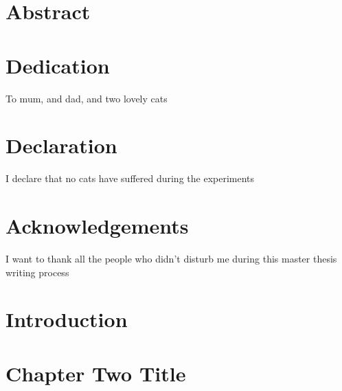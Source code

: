 \documentclass[11pt]{report}
\begin{document}
%     


\newpage

\section*{Abstract}



\newpage

\section*{Dedication}
To mum, and dad, and two lovely cats

\section*{Declaration}
I declare that no cats have suffered during the experiments

\section*{Acknowledgements}
I want to thank all the people who didn't disturb me during this master thesis writing process

\newpage

\tableofcontents
\listoffigures
\listoftables

\newpage


\section{Introduction}


\section{Chapter Two Title}

\end{document}

